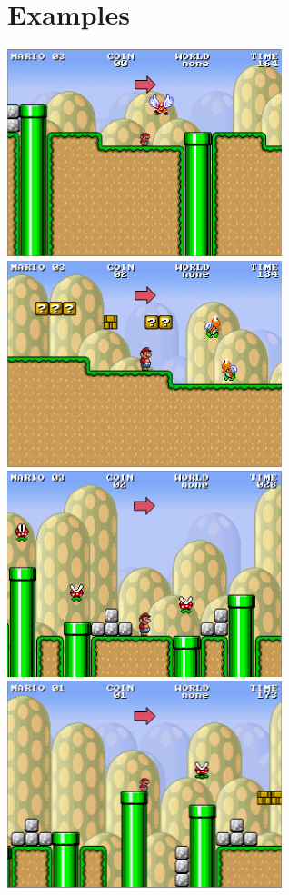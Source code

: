 \documentclass[12pt]{article}
\begin{document}
\section{Examples}
\includegraphics[width=80mm]{Mario1.png} \\
\includegraphics[width=80mm]{Mario2.png} \\
\includegraphics[width=80mm]{Mario3.png} \\
\includegraphics[width=80mm]{Mario4.png} \\
\end{document}
